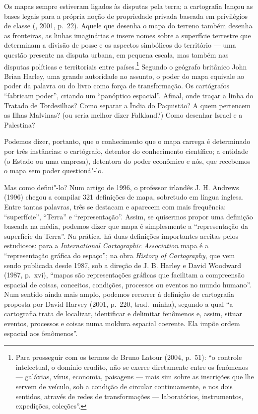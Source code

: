 Os mapas sempre estiveram ligados às disputas pela terra; a cartografia
lançou as bases legais para a própria noção de propriedade privada
baseada em privilégios de classe (, 2001, p.~22). Aquele que
desenha o mapa do terreno também desenha as fronteiras, as linhas
imaginárias e insere nomes sobre a superfície terrestre que determinam a
divisão de posse e os aspectos simbólicos do território --- uma questão
presente na disputa urbana, em pequena escala, mas também nas disputas
políticas e territoriais entre países.\footnote{Para prosseguir com os
  termos de Bruno Latour (2004, p.~51): ``o controle intelectual, o
  domínio erudito, não se exerce diretamente entre os fenômenos ---
  galáxias, vírus, economia, paisagens --- mais sim sobre as inscrições
  que lhe servem de veículo, sob a condição de circular continuamente, e
  nos dois sentidos, através de redes de transformações --- laboratórios,
  instrumentos, expedições, coleções''.} Segundo o geógrafo britânico
John Brian Harley, uma grande autoridade no assunto, o poder do mapa
equivale ao poder da palavra ou do livro como força de transformação. Os
cartógrafos ``fabricam poder'', criando um ``panóptico espacial''.
Afinal, onde traçar a linha do Tratado de Tordesilhas? Como separar a
Índia do Paquistão? A quem pertencem as Ilhas Malvinas? (ou seria melhor
dizer Falkland?) Como desenhar Israel e a Palestina?

Podemos dizer, portanto, que o conhecimento que o mapa carrega é
determinado por três instâncias: o cartógrafo, detentor do conhecimento
científico; a entidade (o Estado ou uma empresa), detentora do poder
econômico e nós, que recebemos o mapa sem poder questioná"-lo.

Mas como defini"-lo? Num artigo de 1996, o professor irlandês J. H.
Andrews (1996) chegou a compilar 321 definições de mapa, sobretudo em
língua inglesa. Entre tantas palavras, três se destacam e aparecem com
mais frequência: ``superfície'', ``Terra'' e ``representação''. Assim,
se quisermos propor uma definição baseada na média, podemos dizer que
mapa é simplesmente a ``representação da superfície da Terra''. Na
prática, há duas definições importantes aceitas pelos estudiosos: para a
\emph{International Cartographic Association} mapa é a
``representação gráfica do espaço''; na obra \emph{History of
Cartography}, que vem sendo publicada desde 1987, sob a direção de J. B.
Harley e David Woodward (1987, p.~xvi), ``mapas são representações
gráficas que facilitam a compreensão espacial de coisas, conceitos,
condições, processos ou eventos no mundo humano''. Num sentido ainda
mais amplo, podemos recorrer à definição de cartografia proposta por
David Harvey (2001, p.~220, trad.~minha), segundo a qual ``a cartografia
trata de localizar, identificar e delimitar fenômenos e, assim, situar
eventos, processos e coisas numa moldura espacial coerente. Ela impõe
ordem espacial aos fenômenos''.

